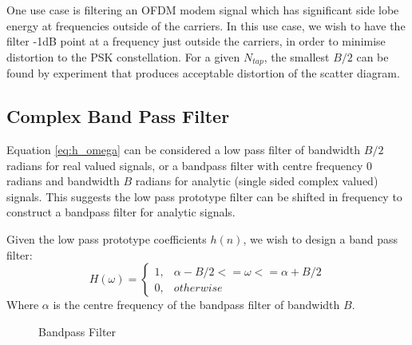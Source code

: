 \documentclass{article}
\begin{document}
One use case is filtering an OFDM modem signal which has significant side lobe energy at frequencies outside of the carriers. In this use case, we wish to have the filter -1dB point at a frequency just outside the carriers, in order to minimise distortion to the PSK constellation.  For a given $N_{tap}$, the smallest $B/2$ can be found by experiment that produces acceptable distortion of the scatter diagram.

\subsection{Complex Band Pass Filter}

Equation \ref{eq:h_omega} can be considered a low pass filter of bandwidth $B/2$ radians for real valued signals, or a bandpass filter with centre frequency 0 radians and bandwidth $B$ radians for analytic (single sided complex valued) signals. This suggests the low pass prototype filter can be shifted in frequency to construct a bandpass filter for analytic signals. 

Given the low pass prototype coefficients $h(n)$, we wish to design a band pass filter:
\begin{equation} \label{eq:h_omega_bp}
  H(\omega)= 
	\begin{cases}
      1, & \alpha - B/2 <= \omega <= \alpha + B/2 \\
      0, & otherwise
	\end{cases}
\end{equation}
Where $\alpha$ is the centre frequency of the bandpass filter of bandwidth $B$.  

\begin{figure}[h]
\caption{Bandpass Filter}
\vspace{5mm}
\label{fig:bandpass_freq}
\centering
{}
\end{figure}
\end{document}
